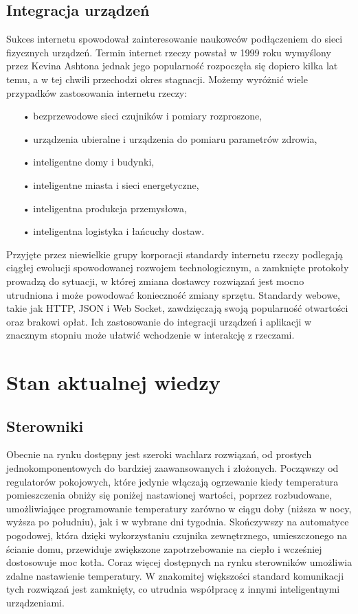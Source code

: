 \documentclass[11pt]{report}
\begin{document}
 \subsection{Integracja urządzeń}
 Sukces internetu spowodował zainteresowanie naukowców podłączeniem do sieci fizycznych urządzeń.
 Termin internet rzeczy powstał w 1999 roku wymyślony przez Kevina Ashtona \cite{Ashton2009} jednak jego popularność rozpoczęła się dopiero kilka lat temu, a w tej chwili przechodzi okres stagnacji.
 Możemy wyróżnić wiele przypadków zastosowania internetu rzeczy:
 \begin{enumerate}
 \item[•] bezprzewodowe sieci czujników i pomiary rozproszone,
 \item[•] urządzenia ubieralne i urządzenia do pomiaru parametrów zdrowia,
 \item[•] inteligentne domy i budynki,
 \item[•] inteligentne miasta i sieci energetyczne,
 \item[•] inteligentna produkcja przemysłowa,
 \item[•] inteligentna logistyka i łańcuchy dostaw.
\end{enumerate}
 Przyjęte przez niewielkie grupy korporacji standardy internetu rzeczy podlegają ciągłej ewolucji spowodowanej rozwojem technologicznym, a zamknięte protokoły prowadzą do sytuacji, w której zmiana dostawcy rozwiązań jest mocno utrudniona i może powodować konieczność zmiany sprzętu. Standardy webowe, takie jak HTTP, JSON i Web Socket, zawdzięczają swoją popularność otwartości oraz brakowi opłat. Ich zastosowanie do integracji urządzeń i aplikacji w znacznym stopniu może ułatwić wchodzenie w interakcję z rzeczami.
 
 \section{Stan aktualnej wiedzy}
 \subsection{Sterowniki}
 Obecnie na rynku dostępny jest szeroki wachlarz rozwiązań, od prostych jednokomponentowych do bardziej zaawansowanych i złożonych. Począwszy od regulatorów pokojowych, które jedynie włączają ogrzewanie kiedy temperatura pomieszczenia obniży się poniżej nastawionej wartości, poprzez rozbudowane, umożliwiające programowanie temperatury zarówno w ciągu doby (niższa w nocy, wyższa po południu), jak i w wybrane dni tygodnia. Skończywszy na automatyce pogodowej, która dzięki wykorzystaniu czujnika zewnętrznego, umieszczonego na ścianie domu, przewiduje zwiększone zapotrzebowanie na ciepło i wcześniej dostosowuje moc kotła.
 Coraz więcej dostępnych na rynku sterowników umożliwia zdalne nastawienie temperatury. W znakomitej większości standard komunikacji tych rozwiązań jest zamknięty, co utrudnia współpracę  z innymi inteligentnymi urządzeniami.
\end{document}
